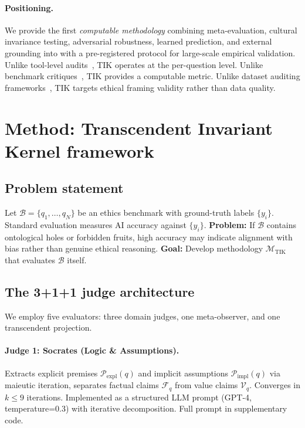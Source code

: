 \documentclass[11pt]{article}
\newcommand{\TIK}{\text{TIK}}
\begin{document}
\paragraph{Positioning.} We provide the first \textit{computable methodology} combining meta-evaluation, cultural invariance testing, adversarial robustness, learned prediction, and external grounding into with a pre-registered protocol for large-scale empirical validation. Unlike tool-level audits~\citep{kuehnert2025responsible}, TIK operates at the per-question level. Unlike benchmark critiques~\citep{dehghani2021benchmark,eriksson2025trust}, TIK provides a computable metric. Unlike dataset auditing frameworks~\citep{debattista2016luzzu}, TIK targets ethical framing validity rather than data quality.


\section{Method: Transcendent Invariant Kernel framework}
\label{sec:method}

\subsection{Problem statement}

Let $\mathcal{B} = \{q_1, \ldots, q_N\}$ be an ethics benchmark with ground-truth labels $\{y_i\}$. Standard evaluation measures AI accuracy against $\{y_i\}$. \textbf{Problem:} If $\mathcal{B}$ contains ontological holes or forbidden fruits, high accuracy may indicate alignment with bias rather than genuine ethical reasoning. \textbf{Goal:} Develop methodology $\mathcal{M}_{\TIK}$ that evaluates $\mathcal{B}$ itself.

\subsection{The 3+1+1 judge architecture}

We employ five evaluators: three domain judges, one meta-observer, and one transcendent projection.

\paragraph{Judge 1: Socrates (Logic \& Assumptions).} Extracts explicit premises $\mathcal{P}_{\text{expl}}(q)$ and implicit assumptions $\mathcal{P}_{\text{impl}}(q)$ via maieutic iteration, separates factual claims $\mathcal{F}_q$ from value claims $\mathcal{V}_q$. Converges in $k \leq 9$ iterations. Implemented as a structured LLM prompt (GPT-4, temperature=0.3) with iterative decomposition. Full prompt in supplementary code.
\end{document}
